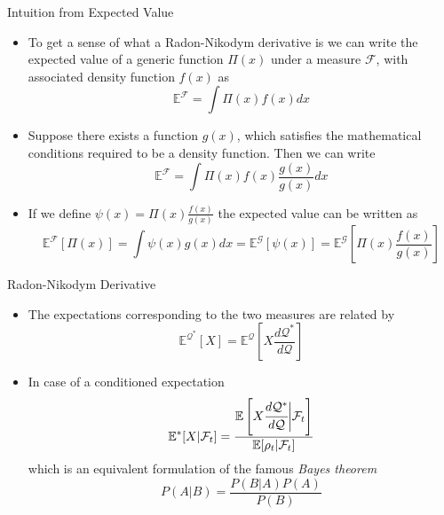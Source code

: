 \documentclass{beamer}
\begin{document}
\begin{frame}{Intuition from Expected Value}
  \begin{itemize}
  \item To get a sense of what a Radon-Nikodym derivative is we can write the expected value of a generic function $\Pi(x)$ under a measure $\mathcal{F}$, with associated density function $f(x)$ as
    \begin{equation*}
      \mathbb{E}^\mathcal{F}=\int\Pi(x)f(x)dx
    \end{equation*}
  \item Suppose there exists a function $g(x)$, which satisfies the mathematical conditions required to be a density function. Then we can write
    \begin{equation*}
      \mathbb{E}^\mathcal{F}=\int\Pi(x)f(x)\frac{g(x)}{g(x)}dx
    \end{equation*}
  \item If we define $\psi(x)=\Pi(x)\frac{f(x)}{g(x)}$ the expected value can be written as 
    \begin{equation*}
      \mathbb{E}^\mathcal{F}[\Pi(x)]=\int\psi(x)g(x)dx=\mathbb{E}^\mathcal{G}[\psi(x)]=\mathbb{E}^\mathcal{G}\left[\Pi(x)\frac{f(x)}{g(x)}\right]
    \end{equation*}
  \end{itemize}
\end{frame}

\begin{frame}{Radon-Nikodym Derivative}
  \begin{itemize}
  \item The expectations corresponding to the two measures are related by
    \begin{equation*}
      \mathbb{E}^{\mathcal{Q}^*}[X] = \mathbb{E}^\mathcal{Q}\left[X\frac{d\mathcal{Q}^*}{d\mathcal{Q}}\right]
    \end{equation*}
	\pause
  \item In case of a conditioned expectation
    \begin{equation}
      \mathbb{E}^*[X|\mathcal{F}_t] = \frac{\mathbb{E}\left[X\cfrac{d\mathcal{Q}^*}{d\mathcal{Q}}\bigg|\mathcal{F}_t\right]}{\mathbb{E}[\rho_t|\mathcal{F}_t]}
      \label{eq:conditioned_expectation}
    \end{equation}
    which is an equivalent formulation of the famous \emph{Bayes theorem}
    \begin{equation*}
      P(A|B)=\frac{P(B|A)P(A)}{P(B)}
    \end{equation*}
  \end{itemize}
\end{frame}
\end{document}
